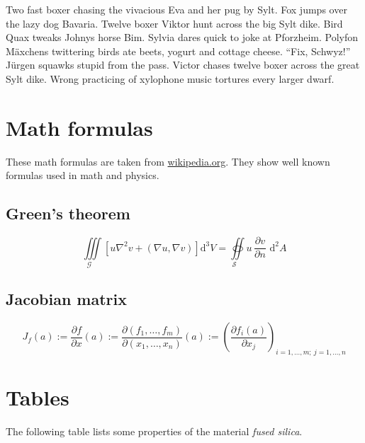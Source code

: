 \documentclass[%
   final,      %
   paper=a4,%
   paper=portrait, %
   pagesize=auto, %
   fontsize=11pt,%
   version=last, %
   english, %
 ]{scrbook} %
\begin{document}
Two fast boxer chasing the vivacious Eva and her pug by Sylt. Fox jumps over the lazy dog Bavaria. Twelve boxer Viktor hunt across the big Sylt dike. Bird Quax tweaks Johnys horse Bim. Sylvia dares quick to joke at Pforzheim. Polyfon Mäxchens twittering birds ate beets, yogurt and cottage cheese. \enquote{Fix, Schwyz!} Jürgen squawks stupid from the pass. Victor chases twelve boxer across the great Sylt dike. Wrong practicing of xylophone music tortures every larger dwarf.

\section*{Math formulas}
These math formulas are taken from \url{wikipedia.org}. They show well known formulas used in math and physics.

\subsection*{Green's theorem}
%
\begin{equation}
  \underset{\mathcal{G}\quad}\iiint
  \left[u\nabla^{2}v+\left(\nabla  u,\nabla  v\right)\right]\mathrm{d}^{3}V
  =\underset{\mathcal{S}\quad}\oiint  u\,\frac{\partial v}{\partial n}
  \,\,\mathrm{d}^{2}A
\end{equation}
%
\subsection*{Jacobian matrix}
%
\begin{equation}
  J_f(a) := \frac{\partial {f}}{\partial {x}}(a) 
         := \frac{\partial(f_1,  \ldots, f_m)}{\partial(x_1, \ldots, x_n)}(a)
         := \left(\frac{\partial f_i(a)}{\partial x_j}\right)_{i=1,\ldots,m;\
             j=1,\ldots,n}
\end{equation}

\section*{Tables}
The following table lists some properties of the material \emph{fused silica}. 
\end{document}
